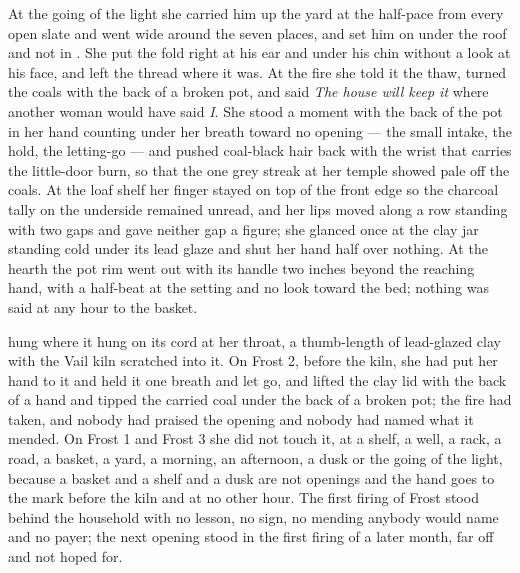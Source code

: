 At the going of the light she carried him up the yard at the half-pace from every open slate and went wide around the seven places, and set him on  under the roof and not in . She put the fold right at his ear and under his chin without a look at his face, and left the thread where it was. At the fire she told it the thaw, turned the coals with the back of a broken pot, and said \emph{The house will keep it} where another woman would have said \emph{I}. She stood a moment with the back of the pot in her hand counting under her breath toward no opening --- the small intake, the hold, the letting-go --- and pushed coal-black hair back with the wrist that carries the little-door burn, so that the one grey streak at her temple showed pale off the coals. At the loaf shelf her finger stayed on top of the front edge so the charcoal tally on the underside remained unread, and her lips moved along a row standing with two gaps and gave neither gap a figure; she glanced once at the clay jar standing cold under its lead glaze and shut her hand half over nothing. At the hearth the pot rim went out with its handle two inches beyond the reaching hand, with a half-beat at the setting and no look toward the bed; nothing was said at any hour to the basket.

 hung where it hung on its cord at her throat, a thumb-length of lead-glazed clay with the Vail kiln scratched into it. On Frost 2, before the kiln, she had put her hand to it and held it one breath and let go, and lifted the clay lid with the back of a hand and tipped the carried coal under the back of a broken pot; the fire had taken, and nobody had praised the opening and nobody had named what it mended. On Frost 1 and Frost 3 she did not touch it, at a shelf, a well, a rack, a road, a basket, a yard, a morning, an afternoon, a dusk or the going of the light, because a basket and a shelf and a dusk are not openings and the hand goes to the mark before the kiln and at no other hour. The first firing of Frost stood behind the household with no lesson, no sign, no mending anybody would name and no payer; the next opening stood in the first firing of a later month, far off and not hoped for.

\scenebreak

